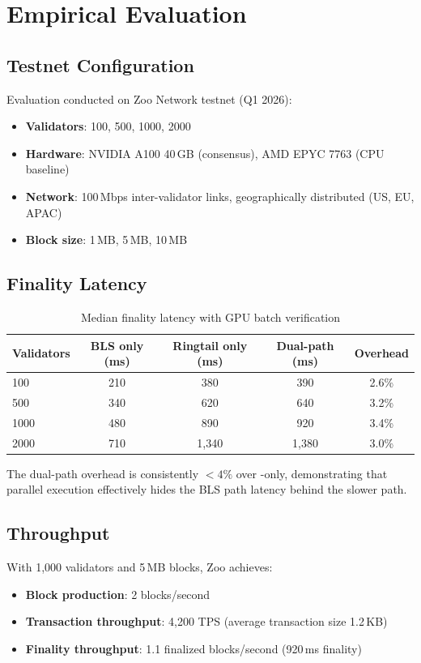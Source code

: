 \section{Empirical Evaluation}


\subsection{Testnet Configuration}

Evaluation conducted on Zoo Network testnet (Q1 2026):
\begin{itemize}
\item \textbf{Validators}: 100, 500, 1000, 2000
\item \textbf{Hardware}: NVIDIA A100 40\,GB (consensus), AMD EPYC 7763 (CPU baseline)
\item \textbf{Network}: 100\,Mbps inter-validator links, geographically distributed (US, EU, APAC)
\item \textbf{Block size}: 1\,MB, 5\,MB, 10\,MB
\end{itemize}

\subsection{Finality Latency}

\begin{table}[h]
\centering
\begin{tabular}{lcccc}
\toprule
\textbf{Validators} & \textbf{BLS only (ms)} & \textbf{Ringtail only (ms)} & \textbf{Dual-path (ms)} & \textbf{Overhead} \\
\midrule
100 & 210 & 380 & 390 & 2.6\% \\
500 & 340 & 620 & 640 & 3.2\% \\
1000 & 480 & 890 & 920 & 3.4\% \\
2000 & 710 & 1,340 & 1,380 & 3.0\% \\
\bottomrule
\end{tabular}
\caption{Median finality latency with GPU batch verification}
\label{tab:finality}
\end{table}

The dual-path overhead is consistently $< 4\%$ over \Ringtail{}-only, demonstrating that parallel execution effectively hides the BLS path latency behind the slower \Ringtail{} path.

\subsection{Throughput}

With 1,000 validators and 5\,MB blocks, Zoo achieves:
\begin{itemize}
\item \textbf{Block production}: 2 blocks/second
\item \textbf{Transaction throughput}: 4,200 TPS (average transaction size 1.2\,KB)
\item \textbf{Finality throughput}: 1.1 finalized blocks/second (920\,ms finality)
\end{itemize}

